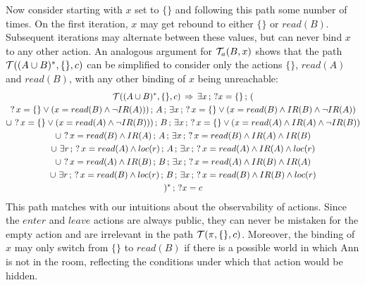  Now consider starting with $x$ set to $\{\}$ and following this
path some number of times. On the first iteration, $x$ may get rebound
to either $\{\}$ or $read(B)$. Subsequent iterations may alternate
between these values, but can never bind $x$ to any other action.
An analogous argument for $\mathcal{T}_{a}(B,x)$ shows that the path $\mathcal{T}((A\cup B)^{*},\{\},c)$
can be simplified to consider only the actions $\{\}$, $read(A)$
and $read(B)$, with any other binding of $x$ being unreachable:\begin{multline*}
\mathcal{T}((A\cup B)^{*},\{\},c)\,\Rightarrow\,\exists x\,;\,?x=\{\}\,;\,(\\
?\, x=\{\}\vee(x=read(B)\wedge\neg IR(A)))\,;\, A\,;\,\exists x\,;\,?\, x=\{\}\vee(x=read(B)\wedge IR(B)\wedge\neg IR(A))\\
\cup\,\,?\, x=\{\}\vee(x=read(A)\wedge\neg IR(B)))\,;\, B\,;\,\exists x\,;\,?\, x=\{\}\vee(x=read(A)\wedge IR(A)\wedge\neg IR(B))\\
\cup\,\,?\, x=read(B)\wedge IR(A)\,;\, A\,;\,\exists x\,;\,?\, x=read(B)\wedge IR(A)\wedge IR(B)\\
\cup\,\,\exists r\,;\,?\, x=read(A)\wedge loc(r)\,;\, A\,;\,\exists x\,;\,?\, x=read(A)\wedge IR(A)\wedge loc(r)\\
\cup\,\,?\, x=read(A)\wedge IR(B)\,;\, B\,;\,\exists x\,;\,?\, x=read(A)\wedge IR(B)\wedge IR(A)\\
\cup\,\,\exists r\,;\,?\, x=read(B)\wedge loc(r)\,;\, B\,;\,\exists x\,;\,?\, x=read(B)\wedge IR(B)\wedge loc(r)\\
)^{*}\,;\,?x=c\end{multline*}
 This path matches with our intuitions about the observability of
actions. Since the $enter$ and $leave$ actions are always public,
they can never be mistaken for the empty action and are irrelevant
in the path $\mathcal{T}(\pi,\{\},c)$. Moreover, the binding of $x$ may
only switch from $\{\}$ to $read(B)$ if there is a possible world
in which Ann is not in the room, reflecting the conditions under which
that action would be hidden.


